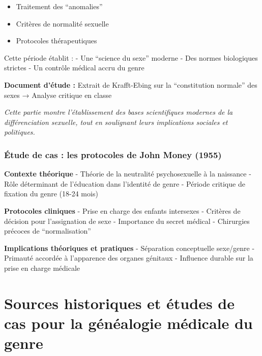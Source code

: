\documentclass[
  letterpaper,
  DIV=11,
  numbers=noendperiod]{scrreprt}
\providecommand{\tightlist}{%
  \setlength{\itemsep}{0pt}\setlength{\parskip}{0pt}}\usepackage{longtable,booktabs,array}
\begin{document}
\begin{itemize}
\tightlist
\item
  Traitement des ``anomalies''
\item
  Critères de normalité sexuelle
\item
  Protocoles thérapeutiques
\end{itemize}

Cette période établit : - Une ``science du sexe'' moderne - Des normes
biologiques strictes - Un contrôle médical accru du genre

\textbf{Document d'étude :} Extrait de Krafft-Ebing sur la
``constitution normale'' des sexes → Analyse critique en classe

\emph{Cette partie montre l'établissement des bases scientifiques
modernes de la différenciation sexuelle, tout en soulignant leurs
implications sociales et politiques.}

\subsection{Étude de cas : les protocoles de John Money
(1955)}\label{uxe9tude-de-cas-les-protocoles-de-john-money-1955}

\textbf{Contexte théorique} - Théorie de la neutralité psychosexuelle à
la naissance - Rôle déterminant de l'éducation dans l'identité de genre
- Période critique de fixation du genre (18-24 mois)

\textbf{Protocoles cliniques} - Prise en charge des enfants intersexes -
Critères de décision pour l'assignation de sexe - Importance du secret
médical - Chirurgies précoces de ``normalisation''

\textbf{Implications théoriques et pratiques} - Séparation conceptuelle
sexe/genre - Primauté accordée à l'apparence des organes génitaux -
Influence durable sur la prise en charge médicale

\subsection{}\label{section-7}


\chapter{Sources historiques et études de cas pour la généalogie
médicale du
genre}\label{sources-historiques-et-uxe9tudes-de-cas-pour-la-guxe9nuxe9alogie-muxe9dicale-du-genre}
\end{document}
